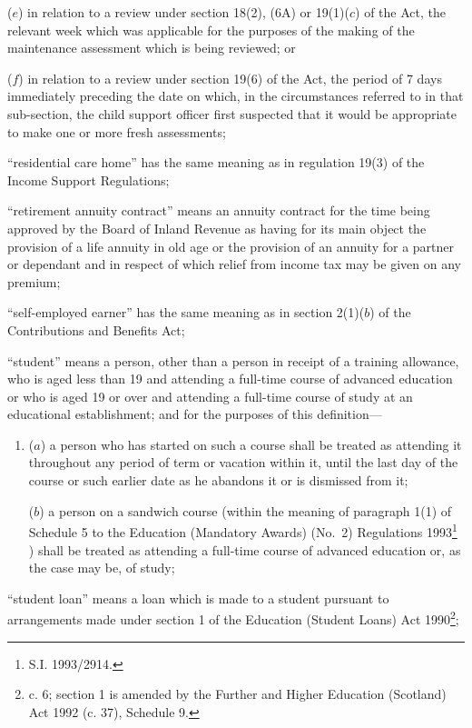 \documentclass[a4paper]{article}
\begin{document}
\begin{enumerate}
\begin{enumerate}
($e$) in relation to a review under section 18(2), (6A) or 19(1)($c$) of the Act, the relevant week which was applicable for the purposes of the making of the maintenance assessment which is being reviewed; or

($f$) in relation to a review under section 19(6) of the Act, the period of 7 days immediately preceding the date on which, in the circumstances referred to in that sub-section, the child support officer first suspected that it would be appropriate to make one or more fresh assessments;
\end{enumerate}

“residential care home” has the same meaning as in regulation 19(3) of the Income Support Regulations;

“retirement annuity contract” means an annuity contract for the time being approved by the Board of Inland Revenue as having for its main object the provision of a life annuity in old age or the provision of an annuity for a partner or dependant and in respect of which relief from income tax may be given on any premium;

“self-employed earner” has the same meaning as in section 2(1)($b$) of the Contributions and Benefits Act;

“student” means a person, other than a person in receipt of a training allowance, who is aged less than 19 and attending a full-time course of advanced education or who is aged 19 or over and attending a full-time course of study at an educational establishment; and for the purposes of this definition—
\begin{enumerate}\item[]
($a$)
a person who has started on such a course shall be treated as attending it throughout any period of term or vacation within it, until the last day of the course or such earlier date as he abandons it or is dismissed from it;

($b$)
a person on a sandwich course (within the meaning of paragraph 1(1) of Schedule 5 to the 
Education (Mandatory Awards) (No.\ 2) Regulations 1993\footnote{\frenchspacing S.I. 1993/2914.}%
) shall be treated as attending a full-time course of advanced education or, as the case may be, of study;
\end{enumerate}

“student loan” means a loan which is made to a student pursuant to arrangements made under section 1 of the Education (Student Loans) Act 1990\footnote{ c. 6; section 1 is amended by the Further and Higher Education (Scotland) Act 1992 (c. 37), Schedule 9.};


\end{enumerate}
\end{document}
